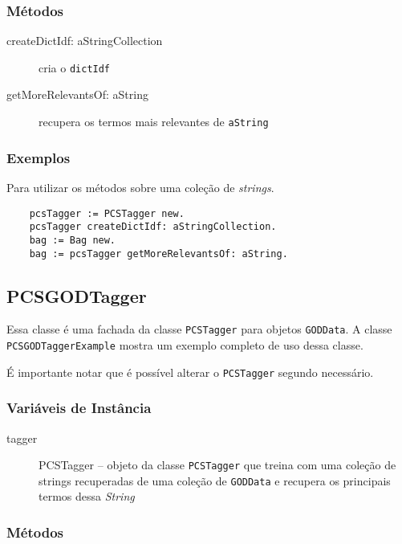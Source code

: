 \subsubsection{Métodos}

\begin{description}
    \item [createDictIdf: aStringCollection] cria o \texttt{dictIdf}
    \item [getMoreRelevantsOf: aString] recupera os termos mais relevantes de \texttt{aString}
\end{description}


\subsubsection{Exemplos}
Para utilizar os métodos sobre uma coleção de \textit{strings}.
    \begin{verbatim}
    pcsTagger := PCSTagger new.
    pcsTagger createDictIdf: aStringCollection.
    bag := Bag new.
    bag := pcsTagger getMoreRelevantsOf: aString.
    \end{verbatim}
    
\subsection{PCSGODTagger}
Essa classe é uma fachada da classe \texttt{PCSTagger} para objetos \texttt{GODData}. A classe
\texttt{PCSGODTaggerExample} mostra um exemplo completo de uso dessa classe.

É importante notar que é possível alterar o \texttt{PCSTagger} segundo necessário.

\subsubsection{Variáveis de Instância}
\begin{description}
 \item  [tagger] PCSTagger -- objeto da classe \texttt{PCSTagger} que treina com uma coleção de 
                              strings recuperadas de uma coleção de \texttt{GODData} e recupera
                              os principais termos dessa \textit{String}
\end{description}


\subsubsection{Métodos}


